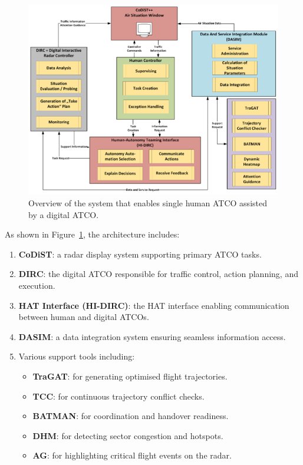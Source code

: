 \begin{figure}[!ht]
    \centering
    \includegraphics[width=.7\textwidth]{img/digital-atco.png}
    \caption{Overview of the system that enables single human \gls{ATCO} assisted by a digital \gls{ATCO}. \cite{Jameel_2023}}
    \label{digital-atco}
\end{figure}

As shown in Figure~\ref{digital-atco}, the architecture includes:
\begin{enumerate}
    \item \textbf{\gls{CoDiST}}: a radar display system supporting primary \gls{ATCO} tasks.
    \item \textbf{\gls{DIRC}}: the digital \gls{ATCO} responsible for traffic control, action planning, and execution.
    \item \textbf{\gls{HAT} Interface (HI-DIRC)}: the \gls{HAT} interface enabling communication between human and digital \glspl{ATCO}.
    \item \textbf{\gls{DASIM}}: a data integration system ensuring seamless information access.
    \item Various support tools including:
        \begin{itemize}
            \item \textbf{\gls{TraGAT}}: for generating optimised flight trajectories.
            \item \textbf{\gls{TCC}}: for continuous trajectory conflict checks.
            \item \textbf{\gls{BATMAN}}: for coordination and handover readiness.
            \item \textbf{\gls{DHM}}: for detecting sector congestion and hotspots.
            \item \textbf{\gls{AG}}: for highlighting critical flight events on the radar.
        \end{itemize}
\end{enumerate}

